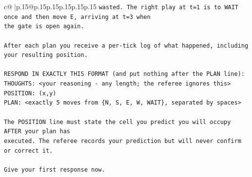 \documentclass{article}
\begin{document}
{\begin{supertabular}{c@{$\;$}|p{.15\linewidth}@{}p{.15\linewidth}p{.15\linewidth}p{.15\linewidth}p{.15\linewidth}p{.15\linewidth}}
{{{\texttt{wasted. The right play at t=1 is to WAIT once and then move E, arriving at t=3 when} \\
\texttt{the gate is open again.} \\
\\ 
\texttt{After each plan you receive a per{-}tick log of what happened, including your resulting position.} \\
\\ 
\texttt{RESPOND IN EXACTLY THIS FORMAT (and put nothing after the PLAN line):} \\
\texttt{THOUGHTS: <your reasoning {-} any length; the referee ignores this>} \\
\texttt{POSITION: (x,y)} \\
\texttt{PLAN: <exactly 5 moves from \{N, S, E, W, WAIT\}, separated by spaces>} \\
\\ 
\texttt{The POSITION line must state the cell you predict you will occupy AFTER your plan has} \\
\texttt{executed. The referee records your prediction but will never confirm or correct it.} \\
\\ 
\texttt{Give your first response now.} \\
            }
        }
    }
     \\ \\


\end{supertabular}}
\end{document}
